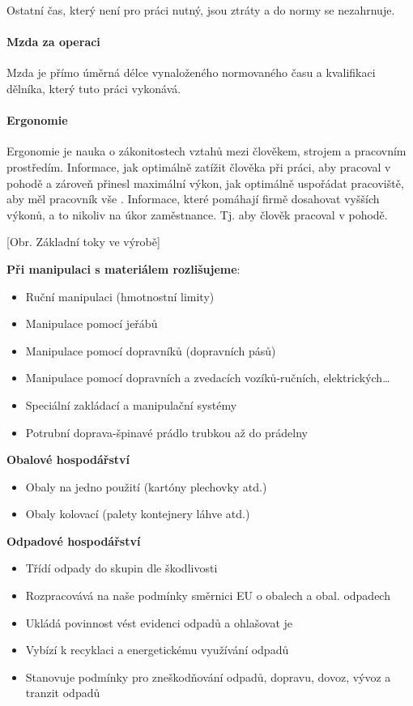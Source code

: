 Ostatní čas, který není pro práci nutný, jsou ztráty a do normy se nezahrnuje.

\paragraph*{Mzda za operaci}
Mzda je přímo úměrná délce vynaloženého normovaného času a kvalifikaci dělníka, který tuto práci vykonává.

\paragraph*{Ergonomie}
Ergonomie je nauka o zákonitostech vztahů mezi člověkem, strojem a pracovním prostředím. Informace, jak optimálně zatížit člověka při práci, aby pracoval v pohodě a zároveň přinesl maximální výkon, jak optimálně uspořádat pracoviště, aby měl pracovník vše . Informace, které pomáhají firmě dosahovat vyšších výkonů, a to nikoliv na úkor zaměstnance. Tj. aby člověk pracoval v pohodě.

[Obr. Základní toky ve výrobě]

\textbf*{Při manipulaci s materiálem rozlišujeme}:
\begin{itemize}
    \item Ruční manipulaci (hmotnostní limity)
    \item Manipulace pomocí jeřábů
    \item Manipulace pomocí dopravníků (dopravních pásů)
    \item Manipulace pomocí dopravních a zvedacích vozíků-ručních, elektrických\ldots
    \item Speciální zakládací a manipulační systémy
    \item Potrubní doprava-špinavé prádlo trubkou až do prádelny
\end{itemize}

\textbf{Obalové hospodářství}
\begin{itemize}
    \item Obaly na jedno použití (kartóny plechovky atd.)
    \item Obaly kolovací (palety kontejnery láhve atd.)
\end{itemize}

\textbf{Odpadové hospodářství}
\begin{itemize}
    \item Třídí odpady do skupin dle škodlivosti
    \item Rozpracovává na naše podmínky směrnici EU o obalech a obal. odpadech
    \item Ukládá povinnost vést evidenci odpadů a ohlašovat je
    \item Vybízí k recyklaci a energetickému využívání odpadů
    \item Stanovuje podmínky pro zneškodňování odpadů, dopravu, dovoz, vývoz a tranzit odpadů
\end{itemize}

